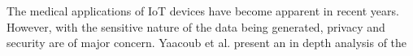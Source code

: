 The medical applications of IoT devices have become apparent in recent years.
However, with the sensitive nature of the data being generated, privacy and
security are of major concern. Yaacoub et al. present an in depth analysis of
the
